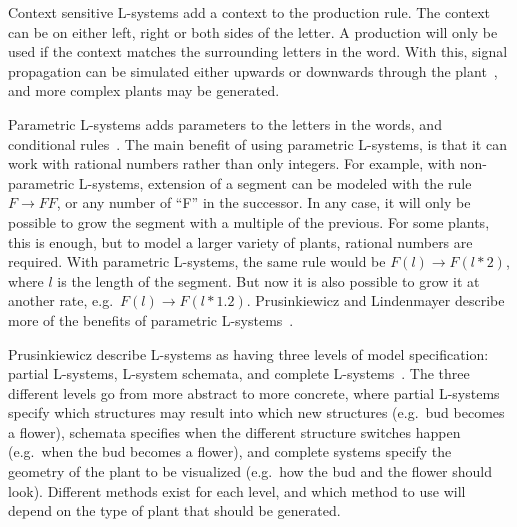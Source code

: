 Context sensitive L-systems add a context to the production rule.
The context can be on either left, right or both sides of the letter.
A production will only be used if the context matches the surrounding letters in the word.
With this, signal propagation can be simulated either upwards or downwards through the plant~\cite{2012Prusinkiewicz}, and more complex plants may be generated.

Parametric L-systems adds parameters to the letters in the words, and conditional rules~\cite{2012Prusinkiewicz}.
The main benefit of using parametric L-systems, is that it can work with rational numbers rather than only integers.
For example, with non-parametric L-systems, extension of a segment can be modeled with the rule $F\rightarrow FF$, or any number of ``F'' in the successor.
In any case, it will only be possible to grow the segment with a multiple of the previous.
For some plants, this is enough, but to model a larger variety of plants, rational numbers are required.
With parametric L-systems, the same rule would be $F(l)\rightarrow F(l*2)$, where $l$ is the length of the segment.
But now it is also possible to grow it at another rate, e.g.\ $F(l)\rightarrow F(l*1.2)$.
Prusinkiewicz and Lindenmayer describe more of the benefits of parametric L-systems~\cite{2012Prusinkiewicz}.

Prusinkiewicz describe L-systems as having three levels of model specification: partial L-systems, L-system schemata, and complete L-systems~\cite{2012Prusinkiewicz}.
The three different levels go from more abstract to more concrete, where partial L-systems specify which structures may result into which new structures (e.g.\ bud becomes a flower), schemata specifies when the different structure switches happen (e.g.\ when the bud becomes a flower), and complete systems specify the geometry of the plant to be visualized (e.g.\ how the bud and the flower should look).
Different methods exist for each level, and which method to use will depend on the type of plant that should be generated.

